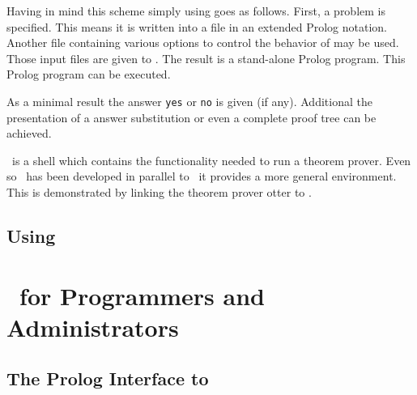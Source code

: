 Having in mind this scheme simply using \ProCom{} goes as follows. First, a
problem is specified. This means it is written into a file in an extended
Prolog notation. Another file containing various options to control the
behavior of \ProCom{} may be used. Those input files are given to \ProCom.
The result is a stand-alone Prolog program. This Prolog program can be
executed.

As a minimal result the answer {\tt yes} or {\tt no} is given (if any).
Additional the presentation of a answer substitution or even a complete proof
tree can be achieved.

\ProTop\ is a shell which contains the functionality needed to run a theorem
prover. Even so \ProTop\ has been developed in parallel to \ProCom\ it
provides a more general environment. This is demonstrated by linking the
theorem prover otter \cite{mccune:otter} to \ProTop.







\chapter{Using \ProCom}







\part{\ProTop\ for Programmers and Administrators}


\chapter{The Prolog Interface to \ProTop}







\WithUnderscore{\printindex}

